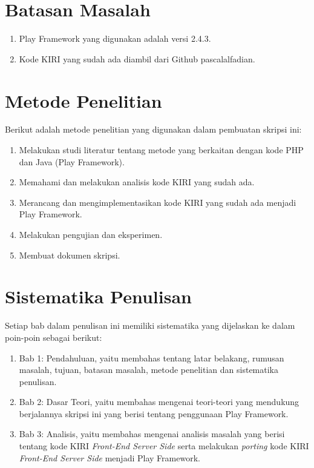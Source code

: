 \section{Batasan Masalah}
\label{sec:batasanMasalah}
\begin{enumerate}
	\item Play Framework yang digunakan adalah versi 2.4.3.
	\item Kode KIRI yang sudah ada diambil dari Github pascalalfadian\cite{githubkiri}.
\end{enumerate}

\section{Metode Penelitian}
\label{sec:metodePenelitian}
Berikut adalah metode penelitian yang digunakan dalam pembuatan skripsi ini:
	\begin{enumerate}
		\item Melakukan studi literatur tentang metode yang berkaitan dengan kode PHP dan Java (Play Framework).
		\item Memahami dan melakukan analisis kode KIRI yang sudah ada.
		\item Merancang dan mengimplementasikan kode KIRI yang sudah ada menjadi Play Framework.
		\item Melakukan pengujian dan eksperimen.
		\item Membuat dokumen skripsi.
	\end{enumerate}
	
\section{Sistematika Penulisan}
\label{sec:sistematikaPenulisan}
Setiap bab dalam penulisan ini memiliki sistematika yang dijelaskan ke dalam poin-poin sebagai berikut:
	\begin{enumerate}
		\item Bab 1: Pendahuluan, yaitu membahas tentang latar belakang, rumusan masalah, tujuan, batasan masalah, metode penelitian dan sistematika penulisan.
		\item Bab 2: Dasar Teori, yaitu membahas mengenai teori-teori yang mendukung berjalannya skripsi ini yang berisi tentang penggunaan Play Framework.
		\item Bab 3: Analisis, yaitu membahas mengenai analisis masalah yang berisi tentang kode KIRI \textit{Front-End Server Side} serta melakukan \textit{porting} kode KIRI \textit{Front-End Server Side} menjadi Play Framework.
	\end{enumerate}